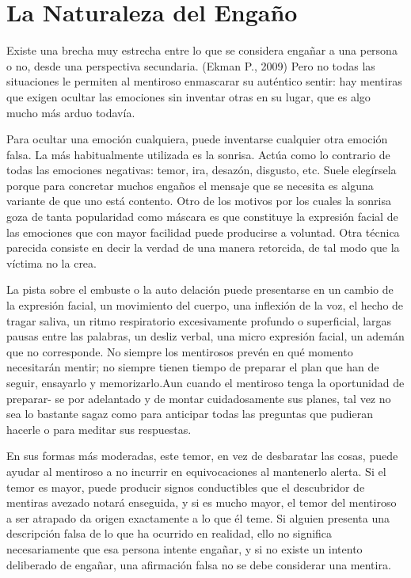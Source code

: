 \section{La Naturaleza del Engaño}
Existe una brecha muy estrecha entre lo que se considera engañar a una persona o no, desde una perspectiva secundaria. (Ekman P., 2009)
Pero no todas las situaciones le permiten al mentiroso enmascarar su auténtico sentir: hay mentiras que exigen ocultar las emociones sin inventar otras en su lugar, que es algo mucho más arduo todavía.

Para ocultar una emoción cualquiera, puede inventarse cualquier otra emoción falsa. La más habitualmente utilizada es la sonrisa. Actúa como lo contrario de todas las emociones negativas: temor, ira, desazón, disgusto, etc. Suele elegírsela porque para concretar muchos engaños el mensaje que se
necesita es alguna variante de que uno está contento. Otro de los motivos por los cuales la sonrisa goza de tanta popularidad como máscara es que constituye la expresión facial de las emociones que con mayor facilidad puede producirse a voluntad. Otra técnica parecida consiste en decir la verdad de una manera retorcida, de tal modo que la víctima no la crea.

La pista sobre el embuste o la auto delación puede presentarse en un cambio de la expresión facial, un movimiento del cuerpo, una inflexión de la voz, el hecho de tragar saliva, un ritmo respiratorio excesivamente profundo o superficial, largas pausas entre las palabras, un desliz verbal, una micro expresión facial, un ademán que no corresponde. No siempre los mentirosos prevén en qué momento necesitarán mentir; no siempre tienen tiempo de preparar el plan que han de seguir, ensayarlo y memorizarlo.Aun cuando el mentiroso tenga la oportunidad de preparar- se por adelantado y de montar cuidadosamente sus planes, tal vez no sea lo bastante sagaz como para anticipar todas las preguntas que pudieran hacerle o para meditar sus respuestas.

En sus formas más moderadas, este temor, en vez de desbaratar las cosas, puede ayudar al mentiroso a no incurrir en equivocaciones al mantenerlo alerta. Si el temor es mayor, puede producir signos conductibles que el descubridor de mentiras avezado notará enseguida, y si es mucho mayor, el temor del mentiroso a ser atrapado da origen exactamente a lo que él teme. Si alguien presenta una descripción falsa de lo que ha ocurrido en realidad, ello no significa necesariamente que esa persona intente engañar, y si no existe un intento deliberado de engañar, una afirmación falsa no se debe considerar una mentira.

